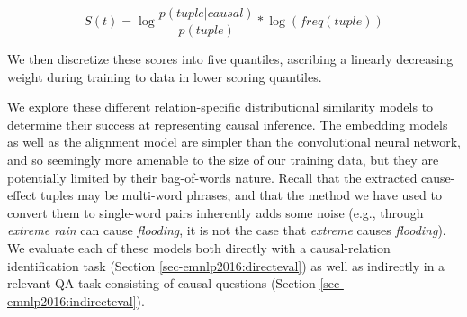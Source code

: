 \begin{equation}
S(t) = \log \frac{p(tuple|causal)}{p(tuple)} * \log (freq(tuple))
\end{equation} 

We then discretize these scores into five quantiles, ascribing a linearly decreasing weight during training to data in lower scoring quantiles.%

We explore these different relation-specific distributional similarity models to determine their success at representing causal inference.  The embedding models as well as the alignment model are simpler than the convolutional neural network, and so seemingly more amenable to the size of our training data, but they are potentially limited by their bag-of-words nature.  Recall that the extracted cause-effect tuples may be multi-word phrases, and that the method we have used to convert them to single-word pairs inherently adds some noise (e.g., through \textit{extreme rain} can cause \textit{flooding}, it is not the case that \textit{extreme} causes \textit{flooding}).  We evaluate each of these models both directly with a causal-relation identification task (Section \ref{sec-emnlp2016:directeval}) as well as indirectly in a relevant QA task consisting of causal questions (Section \ref{sec-emnlp2016:indirecteval}).

